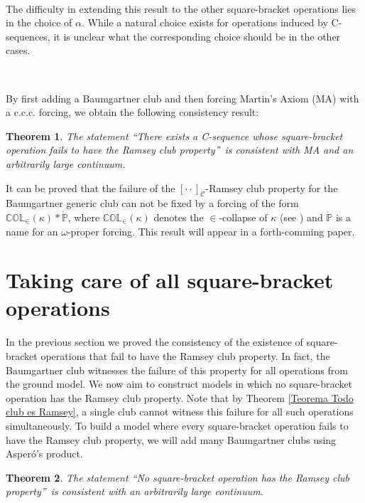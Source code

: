 \documentclass{article}
\newtheorem{theorem}{Theorem}
\begin{document}
\qquad\ \qquad\ \qquad\ \ \ 

The difficulty in extending this result to the other square-bracket operations
lies in the choice of $\alpha.$ While a natural choice exists for operations
induced by \textsf{C}-sequences, it is unclear what the corresponding choice
should be in the other cases.

\qquad\ \qquad\ \ \ \ \ \qquad\ \ \ 

By first adding a Baumgartner club and then forcing Martin's Axiom
(\textsf{MA) }with a \textsf{c.c.c. }forcing, we obtain the following
consistency result:

\begin{theorem}
The statement \textquotedblleft There exists a \textsf{C}-sequence whose
square-bracket operation fails to have the Ramsey club
property\textquotedblright\ is consistent with \textsf{MA }and an arbitrarily
large continuum.
\end{theorem}

It can be proved that the failure of the $[\cdot\cdot]_{\mathcal{C}}$-Ramsey
club property for the Baumgartner generic club can not be fixed by a forcing
of the form $\mathbb{COL}_{\in}\left(  \kappa\right)  \ast\mathbb{\dot{P}}$,
where $\mathbb{COL}_{\in}\left(  \kappa\right)  $ denotes the $\in$-collapse
of $\kappa$ (see \cite{NotesonForcingAxioms}) and $\mathbb{\dot{P}}$ is a name
for an $\omega$-proper forcing. This result will appear in a forth-comming paper.

\section{Taking care of all square-bracket operations
\label{Taking care of all}}

In the previous section we proved the consistency of the existence of
square-bracket operations that fail to have the Ramsey club property. In fact,
the Baumgartner club witnesses the failure of this property for all operations
from the ground model. We now aim to construct models in which no
square-bracket operation has the Ramsey club property. Note that by Theorem
\ref{Teorema Todo club es Ramsey}, a single club cannot witness this failure
for all such operations simultaneously. To build a model where every
square-bracket operation fails to have the Ramsey club property, we will add
many Baumgartner clubs using Asper\'{o}'s product.

\begin{theorem}
The statement \textquotedblleft No square-bracket operation has the Ramsey
club property\textquotedblright\ is consistent with an arbitrarily large
continuum. \label{Teo todas fallan}
\end{theorem}
\end{document}
